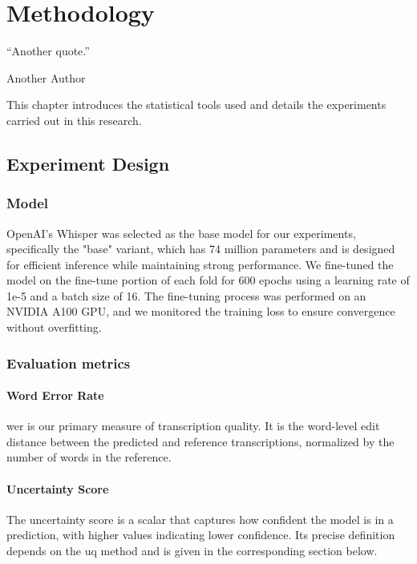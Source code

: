 


\chapter{Methodology}
\label{chapter:methodology}
\epigraph{``Another quote.''}{\vspace{10pt}Another Author }

\newpage

This chapter introduces the statistical tools used and details the experiments carried out in this research.
\section{Experiment Design}
\label{section:experiment-design}

\subsection{Model}

OpenAI's Whisper \cite{radford2023robust} was selected as the base model for our experiments, specifically the "base" variant, which has 74 million parameters and is designed for efficient inference while maintaining strong performance. We fine-tuned the model on the fine-tune portion of each fold for 600 epochs using a learning rate of 1e-5 and a batch size of 16. The fine-tuning process was performed on an NVIDIA A100 GPU, and we monitored the training loss to ensure convergence without overfitting.

\subsection{Evaluation metrics}

\subsubsection{Word Error Rate}
\acrshort{wer} is our primary measure of transcription quality. It is the word-level edit distance between the predicted and reference transcriptions, normalized by the number of words in the reference.

\subsubsection{Uncertainty Score}
The uncertainty score is a scalar that captures how confident the model is in a prediction, with higher values indicating lower confidence. Its precise definition depends on the \acrshort{uq} method and is given in the corresponding section below.

